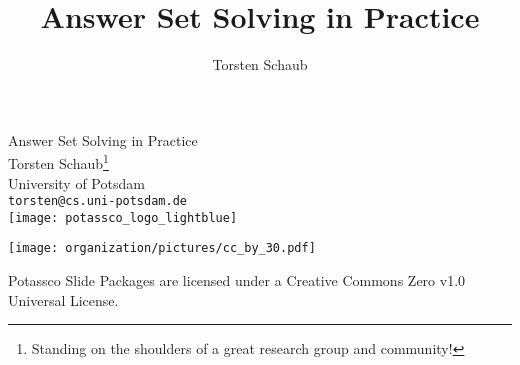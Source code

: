 \title{Answer Set Solving in Practice}
\author{Torsten Schaub}
\begin{frame}[c]
  \bigskip
  \vfill
  \begin{center}%
    \alert{\huge Answer Set Solving in Practice}
    \bigskip
    \bigskip
    \\
    Torsten Schaub\footnote{Standing on the shoulders of a great research group and community!}\\
    University of Potsdam\\
    \texttt{torsten@cs.uni-potsdam.de}\\
    \bigskip
    \texttt{[image: potassco\_logo\_lightblue]}
  \end{center}
  \bigskip
  \begin{center}
    \texttt{[image: organization/pictures/cc\_by\_30.pdf]} %
    \par
    {\tiny Potassco Slide Packages are licensed under a Creative Commons Zero v1.0 Universal License.}
  \end{center}
\end{frame}
%
